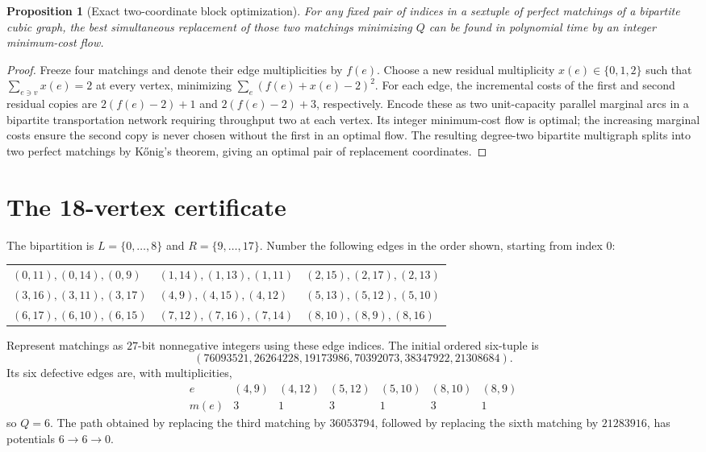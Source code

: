 \documentclass[11pt]{article}
\newtheorem{proposition}[theorem]{Proposition}
\begin{document}
\begin{proposition}[Exact two-coordinate block optimization]
For any fixed pair of indices in a sextuple of perfect matchings
of a bipartite cubic graph, the best simultaneous replacement
of those two matchings minimizing $Q$ can be found in
polynomial time by an integer minimum-cost flow.
\end{proposition}
\begin{proof}
Freeze four matchings and denote their edge multiplicities by
$f(e)$. Choose a new residual multiplicity $x(e)\in\{0,1,2\}$
such that $\sum_{e\ni v}x(e)=2$ at every vertex, minimizing
$\sum_e(f(e)+x(e)-2)^2$. For each edge, the incremental costs
of the first and second residual copies are
$2(f(e)-2)+1$ and $2(f(e)-2)+3$, respectively. Encode these
as two unit-capacity parallel marginal arcs in a bipartite
transportation network requiring throughput two at each
vertex. Its integer minimum-cost flow is optimal; the increasing
marginal costs ensure the second copy is never chosen without
the first in an optimal flow. The resulting degree-two bipartite
multigraph splits into two perfect matchings by K\H onig's
theorem, giving an optimal pair of replacement coordinates.
\end{proof}

\section{The 18-vertex certificate}\label{sec:certificate}
The bipartition is $L=\{0,\ldots,8\}$ and
$R=\{9,\ldots,17\}$. Number the following edges in the order
shown, starting from index $0$:
\begin{center}\small
\begin{tabular}{lll}
$(0,11),(0,14),(0,9)$ & $(1,14),(1,13),(1,11)$ & $(2,15),(2,17),(2,13)$\\
$(3,16),(3,11),(3,17)$ & $(4,9),(4,15),(4,12)$ & $(5,13),(5,12),(5,10)$\\
$(6,17),(6,10),(6,15)$ & $(7,12),(7,16),(7,14)$ & $(8,10),(8,9),(8,16)$
\end{tabular}
\end{center}
Represent matchings as $27$-bit nonnegative integers using
these edge indices. The initial ordered six-tuple is
\[
(76093521,26264228,19173986,70392073,38347922,21308684).
\]
Its six defective edges are, with multiplicities,
\[
\begin{array}{c|rrrrrr}
e&(4,9)&(4,12)&(5,12)&(5,10)&(8,10)&(8,9)\\ \hline
m(e)&3&1&3&1&3&1
\end{array}
\]
so $Q=6$. The path obtained by replacing the third matching
by $36053794$, followed by replacing the sixth matching
by $21283916$, has potentials $6\to6\to0$.
\end{document}
